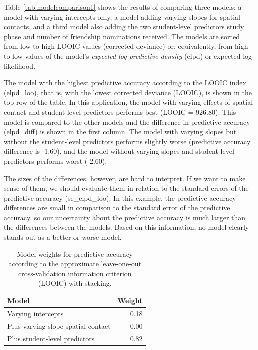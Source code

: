 \documentclass[doc]{apa6}
\begin{document}
Table \ref{tab:modelcomparison1} shows the results of comparing three
models: a model with varying intercepts only, a model adding varying
slopes for spatial contacts, and a third model also adding the two
student-level predictors study phase and number of friendship
nominations received. The models are sorted from low to high LOOIC
values (corrected deviance) or, equivalently, from high to low values of
the model's \emph{expected log predictive density} (elpd) or expected
log-likelihood.

The model with the highest predictive accuracy according to the LOOIC
index (elpd\_loo), that is, with the lowest corrected deviance (LOOIC),
is shown in the top row of the table. In this application, the model
with varying effects of spatial contact and student-level predictors
performs best (LOOIC = 926.80). This model is compared to the other
models and the difference in predictive accuracy (elpd\_diff) is shown
in the first column. The model with varying slopes but without the
student-level predictors performs slightly worse (predictive accuracy
difference is -1.60), and the model without varying slopes and
student-level predictors performs worst (-2.60).

The sizes of the differences, however, are hard to interpret. If we want
to make sense of them, we should evaluate them in relation to the
standard errors of the predictive accuracy (se\_elpd\_loo). In this
example, the predictive accuracy differences are small in comparison to
the standard error of the predictive accuracy, so our uncertainty about
the predictive accuracy is much larger than the differences between the
models. Based on this information, no model clearly stands out as a
better or worse model.

\begin{table}

\caption{\label{tab:modelcomparison2}Model weights for predictive accuracy according to the approximate leave-one-out cross-validation information criterion (LOOIC) with stacking.}
\centering
\fontsize{8}{10}\selectfont
\begin{tabular}[t]{lr}
\toprule
Model & Weight\\
\midrule
Varying intercepts & 0.18\\
Plus varying slope spatial contact & 0.00\\
Plus student-level predictors & 0.82\\
\bottomrule
\end{tabular}
\end{table}
\end{document}
